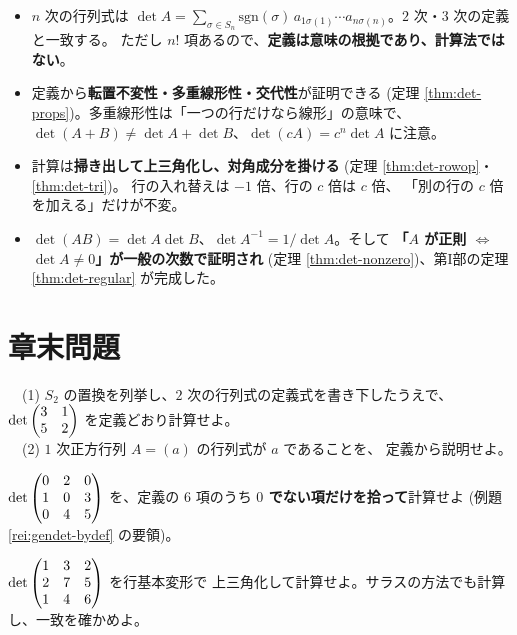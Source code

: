 \begin{matome}
\begin{itemize}
\item $n$ 次の行列式は
$\det A = \sum_{\sigma \in S_n} \mathrm{sgn}(\sigma)\,
a_{1\sigma(1)} \cdots a_{n\sigma(n)}$。$2$ 次・$3$ 次の定義と一致する。
ただし $n!$ 項あるので、\textbf{定義は意味の根拠であり、計算法ではない}。
\item 定義から\textbf{転置不変性・多重線形性・交代性}が証明できる
(定理 \ref{thm:det-props})。多重線形性は「一つの行だけなら線形」の意味で、
$\det(A + B) \neq \det A + \det B$、$\det(cA) = c^n \det A$ に注意。
\item 計算は\textbf{掃き出して上三角化し、対角成分を掛ける}
(定理 \ref{thm:det-rowop}・\ref{thm:det-tri})。
行の入れ替えは $-1$ 倍、行の $c$ 倍は $c$ 倍、
「別の行の $c$ 倍を加える」だけが不変。
\item $\det(AB) = \det A \det B$、$\det A^{-1} = 1/\det A$。そして
\textbf{「$A$ が正則 $\iff$ $\det A \neq 0$」が一般の次数で証明され}
(定理 \ref{thm:det-nonzero})、第I部の定理 \ref{thm:det-regular} が完成した。
\end{itemize}
\end{matome}

\section*{章末問題}

\begin{mondai}[基本]\label{q:gendet-ex1}
　(1) $S_2$ の置換を列挙し、$2$ 次の行列式の定義式を書き下したうえで、
$\det \begin{pmatrix}3 & 1 \\ 5 & 2\end{pmatrix}$ を定義どおり計算せよ。\\
　(2) $1$ 次正方行列 $A = (a)$ の行列式が $a$ であることを、
定義から説明せよ。
\end{mondai}

\begin{mondai}[基本]\label{q:gendet-ex2}
$\det \begin{pmatrix}0 & 2 & 0 \\ 1 & 0 & 3 \\ 0 & 4 & 5\end{pmatrix}$ を、定義の $6$ 項のうち
\textbf{$0$ でない項だけを拾って}計算せよ
(例題 \ref{rei:gendet-bydef} の要領)。
\end{mondai}

\begin{mondai}[基本]\label{q:gendet-ex3}
$\det \begin{pmatrix}1 & 3 & 2 \\ 2 & 7 & 5 \\ 1 & 4 & 6\end{pmatrix}$ を行基本変形で
上三角化して計算せよ。サラスの方法でも計算し、一致を確かめよ。
\end{mondai}

